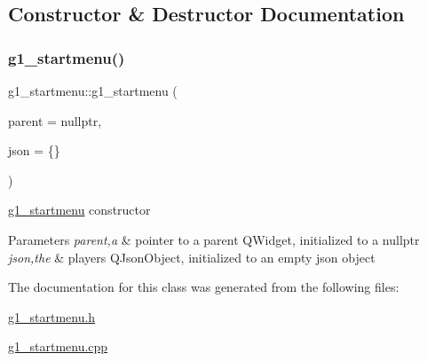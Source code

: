 \subsection{Constructor \& Destructor Documentation}
\mbox{\label{classg1__startmenu_a85efd01ba5b2843e490b702a1aef8f67}} 
\subsubsection{\texorpdfstring{g1\+\_\+startmenu()}{g1\_startmenu()}}
{\footnotesize\ttfamily g1\+\_\+startmenu\+::g1\+\_\+startmenu (\begin{DoxyParamCaption}\item[{Q\+Widget $\ast$}]{parent = {\ttfamily nullptr},  }\item[{Q\+Json\+Object}]{json = {\ttfamily \{\}} }\end{DoxyParamCaption})\hspace{0.3cm}{\ttfamily [explicit]}}



\hyperlink{classg1__startmenu}{g1\+\_\+startmenu} constructor 


\begin{DoxyParams}{Parameters}
{\em parent,a} & pointer to a parent Q\+Widget, initialized to a nullptr \\
\hline
{\em json,the} & player\textquotesingle{}s Q\+Json\+Object, initialized to an empty json object \\
\hline
\end{DoxyParams}


The documentation for this class was generated from the following files\+:\begin{DoxyCompactItemize}
\item 
\hyperlink{g1__startmenu_8h}{g1\+\_\+startmenu.\+h}\item 
\hyperlink{g1__startmenu_8cpp}{g1\+\_\+startmenu.\+cpp}\end{DoxyCompactItemize}
